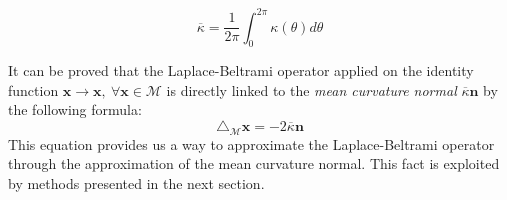  \begin{equation}\label{eq:mean curvature}
 	\overline \kappa=\frac{1}{2 \pi} \int_{0}^{2 \pi} \kappa(\theta) d \theta
 \end{equation}

It can be proved that the Laplace-Beltrami operator applied on the identity function $\mathbf x \rightarrow \mathbf x, \ \forall \mathbf x\in \mathcal M$ is directly linked to the \textit{mean curvature normal} $\overline{\kappa}\mathbf n$ by the following formula:
\begin{equation}\label{eq:laplacian and curvature}
	\triangle_\mathcal M \mathbf x  = -2\overline{\kappa}\mathbf n
\end{equation}
This equation provides us a way to approximate the Laplace-Beltrami operator through the approximation of the mean curvature normal. This fact is exploited by methods presented in the next section.

